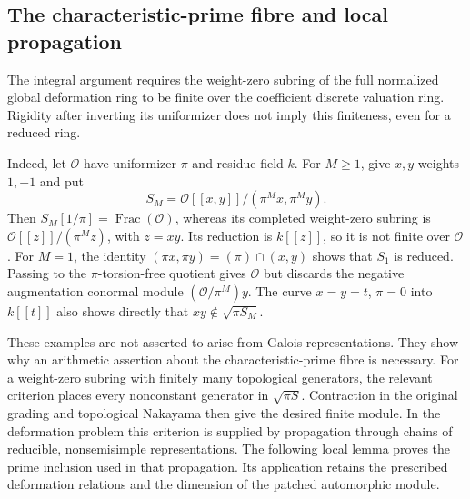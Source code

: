 \subsection{The characteristic-prime fibre and local propagation}
\label{sec:selmer-integral-frontier}

The integral argument requires the weight-zero subring of the full
normalized global deformation ring to be finite over the coefficient
discrete valuation ring. Rigidity after inverting its uniformizer does
not imply this finiteness, even for a reduced ring.

Indeed, let $\mathcal O$ have uniformizer $\pi$ and residue field $k$.
For $M\geq1$, give $x,y$ weights $1,-1$ and put
\[
 S_M=\mathcal O[[x,y]]/(\pi^M x,\pi^M y).
\]
Then $S_M[1/\pi]=\operatorname{Frac}(\mathcal O)$, whereas its completed
weight-zero subring is $\mathcal O[[z]]/(\pi^M z)$, with $z=xy$.
Its reduction is $k[[z]]$, so it is not finite over $\mathcal O$.
For $M=1$, the identity
$(\pi x,\pi y)=(\pi)\cap(x,y)$ shows that $S_1$ is reduced.
Passing to the $\pi$-torsion-free quotient gives $\mathcal O$ but
discards the negative augmentation conormal module
$(\mathcal O/\pi^M)y$. The curve $x=y=t$, $\pi=0$ into $k[[t]]$
also shows directly that $xy\notin\sqrt{\pi S_M}$.

These examples are not asserted to arise from Galois representations.
They show why an arithmetic assertion about the characteristic-prime
fibre is necessary. For a weight-zero subring with finitely many
topological generators, the relevant criterion places every nonconstant
generator in $\sqrt{\pi S}$. Contraction in the original grading and
topological Nakayama then give the desired finite module. In the deformation
problem this criterion is supplied by propagation through chains of
reducible, nonsemisimple representations. The following local lemma
proves the prime inclusion used in that propagation. Its application
retains the prescribed deformation relations and the dimension of the
patched automorphic module.
